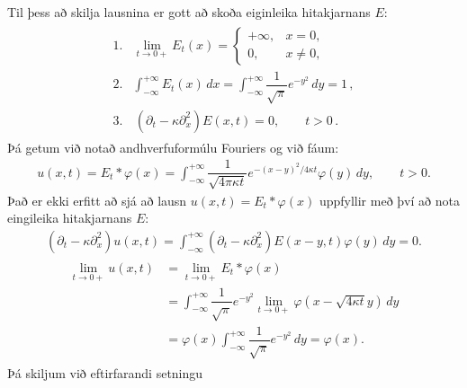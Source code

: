 \documentclass[a4paper,10pt,icelandic]{sphinxmanual}
\begin{document}
Til þess að skilja lausnina er gott að skoða eiginleika hitakjarnans \(E\):
\begin{equation*}
\begin{split}\begin{aligned}
1. & \lim\limits_{t\to 0+} E_t(x) =
\begin{cases} +{\infty}, &x=0,\\
0, &x\neq 0,\end{cases}
\\
2. &
\int_{-{\infty}}^{+{\infty}} E_t(x)\, dx
=\int_{-{\infty}}^{+{\infty}}
\dfrac 1{\sqrt{\pi}}e^{-y^2}\, dy = 1\,,\\
3. & \,({\partial}_t-{\kappa}{\partial}_x^2)E(x,t)=0, \qquad t>0\,.
\end{aligned}\end{split}
\end{equation*}
Þá getum við notað andhverfuformúlu Fouriers og við fáum:
\begin{equation*}
\begin{split}u(x,t)=E_t\ast {\varphi}(x)=\int_{-{\infty}}^{+{\infty}}
\dfrac 1{\sqrt{4{\pi}{\kappa}t}}e^{-(x-y)^2/4{\kappa}t}{\varphi}(y)\,
dy, \qquad t>0.\end{split}
\end{equation*}
Það er ekki erfitt að sjá að lausn  \(u(x,t)=E_t\ast {\varphi}(x)\) uppfyllir {\hyperref[\detokenize{Kafli04:upphafvarmi}]{}} með því að nota eingileika hitakjarnans \(E\):
\begin{equation*}
\begin{split}({\partial}_t-{\kappa}{\partial}_x^2)u(x,t)
=\int_{-{\infty}}^{+{\infty}}
({\partial}_t-{\kappa}{\partial}_x^2)E(x-y,t) {\varphi}(y)\, dy=0.\end{split}
\end{equation*}\begin{equation*}
\begin{split}\begin{aligned}
\lim\limits_{t\to 0+} u(x,t) &=
\lim\limits_{t\to 0+} E_t\ast {\varphi}(x)
\\
&=\int_{-{\infty}}^{+{\infty}}
\dfrac 1{\sqrt{\pi}}e^{-y^2}\lim\limits_{t\to 0+}
{\varphi}(x-\sqrt{4{\kappa}t}y)\, dy\\
&={\varphi}(x)\int_{-{\infty}}^{+{\infty}}
\dfrac 1{\sqrt{\pi}}e^{-y^2}\, dy ={\varphi}(x).\end{aligned}\end{split}
\end{equation*}
Þá skiljum við eftirfarandi setningu
\end{document}
